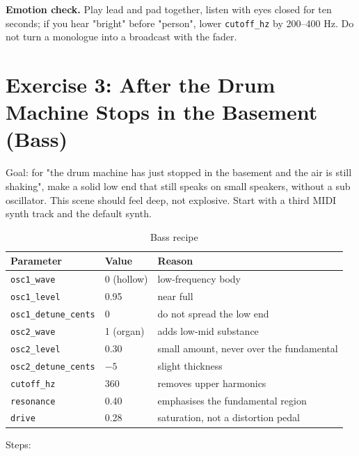 
\noindent\textbf{Emotion check.} Play lead and pad together, listen with eyes closed for ten seconds; if you hear "bright" before "person", lower \texttt{cutoff\_hz} by 200--400 Hz. Do not turn a monologue into a broadcast with the fader.

\section{Exercise 3: After the Drum Machine Stops in the Basement (Bass)}

Goal: for "the drum machine has just stopped in the basement and the air is still shaking", make a solid low end that still speaks on small speakers, without a sub oscillator. This scene should feel deep, not explosive. Start with a third MIDI synth track and the default synth.

\begin{table}[htbp]
\centering
\small
\begin{tabular}{@{}lll@{}}
\hline
Parameter & Value & Reason \\
\hline
\texttt{osc1\_wave} & 0 (hollow) & low-frequency body \\
\texttt{osc1\_level} & 0.95 & near full \\
\texttt{osc1\_detune\_cents} & $0$ & do not spread the low end \\
\texttt{osc2\_wave} & 1 (organ) & adds low-mid substance \\
\texttt{osc2\_level} & 0.30 & small amount, never over the fundamental \\
\texttt{osc2\_detune\_cents} & $-5$ & slight thickness \\
\texttt{cutoff\_hz} & 360 & removes upper harmonics \\
\texttt{resonance} & 0.40 & emphasises the fundamental region \\
\texttt{drive} & 0.28 & saturation, not a distortion pedal \\
\hline
\end{tabular}
\caption{Bass recipe}
\label{tab:bass-recipe}
\end{table}

Steps:

